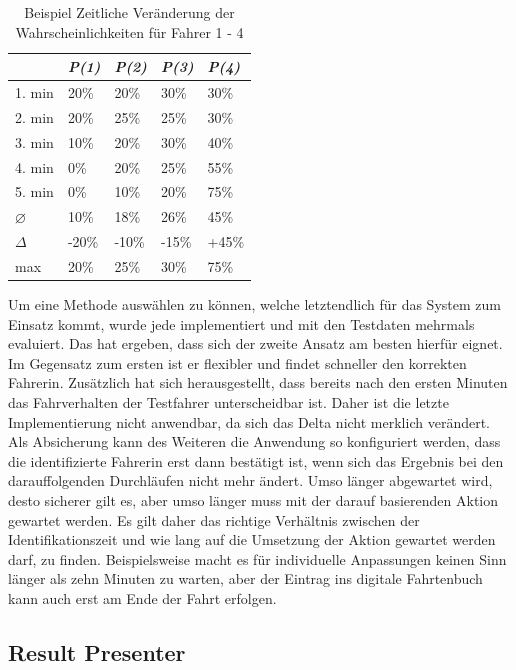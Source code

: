 \begin{table}[htbp]
    \centering
    \caption{Beispiel Zeitliche Veränderung der Wahrscheinlichkeiten für Fahrer 1 - 4}
    \label{tab:time_dependet_analyzis}
    \begin{tabular}{|l|l|l|l|l|}
        \hline
         & \textit{P(1)} & \textit{P(2)} & \textit{P(3)} & \textit{P(4)} \\
        \hline
        1. min & 20\% & 20\% & 30\% & 30\% \\
        2. min & 20\% & 25\% & 25\% & 30\% \\
        3. min & 10\% & 20\% & 30\% & 40\% \\
        4. min & 0\% & 20\% & 25\% & 55\% \\
        5. min & 0\% & 10\% & 20\% & 75\% \\
        \hline
        $\diameter$ & 10\% & 18\% & 26\% & 45\% \\
        \hline
        $\Delta$ & -20\% & -10\% & -15\% & +45\% \\
        \hline
        max & 20\% & 25\% & 30\% & 75\% \\
        \hline
  \end{tabular}
\end{table}

Um eine Methode auswählen zu können, welche letztendlich für das System zum Einsatz kommt, wurde jede implementiert und mit den Testdaten mehrmals evaluiert. Das hat ergeben, dass sich der zweite Ansatz am besten hierfür eignet. Im Gegensatz zum ersten ist er flexibler und findet schneller den korrekten Fahrerin. Zusätzlich hat sich herausgestellt, dass bereits nach den ersten Minuten das Fahrverhalten der Testfahrer unterscheidbar ist. Daher ist die letzte Implementierung nicht anwendbar, da sich das Delta nicht merklich verändert. Als Absicherung kann des Weiteren die Anwendung so konfiguriert werden, dass die identifizierte Fahrerin erst dann bestätigt ist, wenn sich das Ergebnis bei den darauffolgenden Durchläufen nicht mehr ändert. Umso länger abgewartet wird, desto sicherer gilt es, aber umso länger muss mit der darauf basierenden Aktion gewartet werden. Es gilt daher das richtige Verhältnis zwischen der Identifikationszeit und wie lang auf die Umsetzung der Aktion gewartet werden darf, zu finden. Beispielsweise macht es für individuelle Anpassungen keinen Sinn länger als zehn Minuten zu warten, aber der Eintrag ins digitale Fahrtenbuch kann auch erst am Ende der Fahrt erfolgen.

\subsection{Result Presenter}

